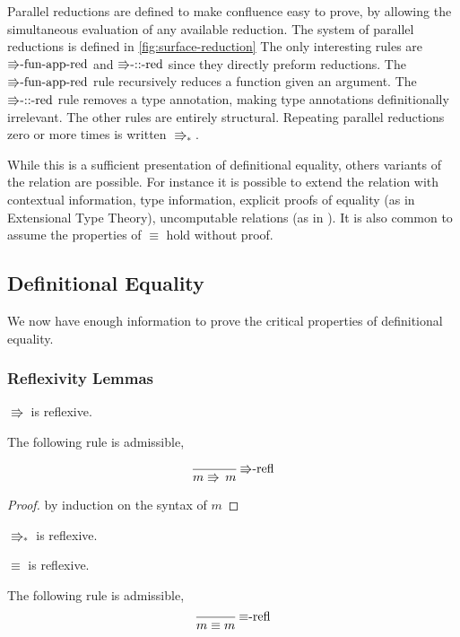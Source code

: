 Parallel reductions are defined to make confluence easy to prove,
by allowing the simultaneous evaluation of any available reduction.
The system of parallel reductions is defined in \ref{fig:surface-reduction}
The only interesting rules are $\textrm{\ensuremath{\Rrightarrow}-fun-app-red}$
and $\textrm{\ensuremath{\Rrightarrow}-::-red}$ since they directly
preform reductions. The $\textrm{\ensuremath{\Rrightarrow}-fun-app-red}$
rule recursively reduces a function given an argument. The $\textrm{\ensuremath{\Rrightarrow}-::-red}$
rule removes a type annotation, making type annotations definitionally
irrelevant. The other rules are entirely structural. Repeating parallel
reductions zero or more times is written $\Rrightarrow_{\ast}$.

While this is a sufficient presentation of\textbf{ }definitional equality,
others variants of the relation are possible. For instance it is possible
to extend the relation with contextual information, type information,
explicit proofs of equality (as in Extensional Type Theory), uncomputable
relations (as in \cite{jia2010dependent}). It is also common to assume
the properties of $\equiv$ hold without proof.

\subsection{Definitional Equality}

We now have enough information to prove the critical properties of
definitional equality.

\subsubsection{Reflexivity Lemmas}
\begin{lem}
$\Rrightarrow$ is reflexive.

The following rule is admissible,

\[
\frac{\,}{m\Rrightarrow\,m}\,\textrm{\ensuremath{\Rrightarrow}-refl}
\]
\end{lem}

\begin{proof}
by induction on the syntax of $m$
\end{proof}
\begin{fact}
$\Rrightarrow_{\ast}$ is reflexive.
\end{fact}

\begin{lem}
$\equiv$ is reflexive.

The following rule is admissible,
\[
\frac{\,}{m\equiv m}\,\textrm{\ensuremath{\equiv}-refl}
\]
\end{lem}

